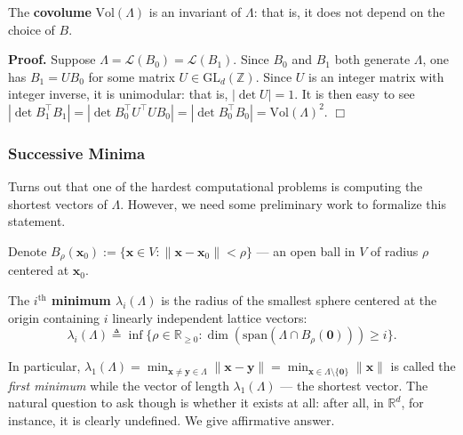 \documentclass{template}
\newcommand{\qedwhite}{\hfill \ensuremath{\Box}}
\begin{document}
\begin{proposition}
    The \textbf{covolume} $\text{Vol}(\Lambda)$ is an invariant of $\Lambda$:
    that is, it does not depend on the choice of $B$.
\end{proposition}

\textbf{Proof.} Suppose $\Lambda = \mathcal{L}(B_0) = \mathcal{L}(B_1)$. Since
$B_0$ and $B_1$ both generate $\Lambda$, one has $B_1 = UB_0$ for some matrix $U
\in \text{GL}_d(\mathbb{Z})$. Since $U$ is an integer matrix with integer
inverse, it is unimodular: that is, $|\det U| = 1$. It is then easy to see
$|\det B_1^{\top}B_1| = |\det B_0^{\top}U^{\top}UB_0| = |\det B_0^{\top}B_0| =
\text{Vol}(\Lambda)^2$. \qedwhite

\subsubsection{Successive Minima}

Turns out that one of the hardest computational problems is computing the
shortest vectors of $\Lambda$. However, we need some preliminary work to
formalize this statement. 

Denote $B_{\rho}(\mathbf{x}_0) := \{\mathbf{x} \in V:
\|\mathbf{x}-\mathbf{x}_0\|<\rho\}$ --- an open ball in $V$ of radius $\rho$
centered at $\mathbf{x}_0$. 

\begin{definition}
    The \textbf{$i^{\text{th}}$ minimum $\lambda_i(\Lambda)$} is the radius 
    of the smallest sphere centered at the origin containing $i$ linearly 
    independent lattice vectors:
    \begin{equation*}
        \lambda_i(\Lambda) \triangleq \inf \{\rho \in \mathbb{R}_{\geq 0}: \dim(\text{span}(\Lambda \cap B_{\rho}(\mathbf{0}))) \geq i\}.
    \end{equation*}
\end{definition}

In particular, $\lambda_1(\Lambda) = \min_{\mathbf{x} \neq \mathbf{y} \in
\Lambda}\|\mathbf{x}-\mathbf{y}\| = \min_{\mathbf{x} \in
\Lambda\setminus\{\mathbf{0}\}}\|\mathbf{x}\|$ is called the \textit{first
minimum} while the vector of length $\lambda_1(\Lambda)$ --- the shortest
vector. The natural question to ask though is whether it exists at all: after
all, in $\mathbb{R}^d$, for instance, it is clearly undefined. We give
affirmative answer.
\end{document}
